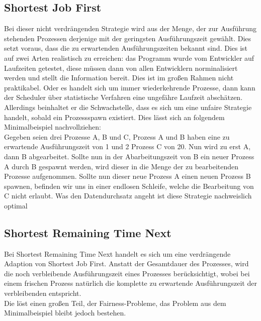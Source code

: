 \subsection{Shortest Job First}
Bei dieser nicht verdrängenden Strategie wird aus der Menge, der zur Ausführung stehenden Prozessen 
derjenige mit der geringsten Ausführungszeit gewählt. Dies setzt voraus, dass die zu erwartenden 
Ausführungszeiten bekannt sind. Dies ist auf zwei Arten realistisch zu erreichen: das Programm wurde vom 
Entwickler auf Laufzeiten getestet, diese müssen dann von allen Entwicklern norminalisiert werden und 
stellt die Information bereit. Dies ist im großen Rahmen nicht praktikabel. Oder es handelt sich um immer 
wiederkehrende Prozesse, dann kann der Scheduler über statistische Verfahren eine ungefähre Laufzeit 
abschätzen. \\
Allerdings beinhaltet er die Schwachstelle, dass es sich um eine unfaire Strategie handelt, sobald ein 
Prozessspawn existiert. Dies lässt sich an folgendem Minimalbeispiel nachvollziehen: \\
Gegeben seien drei Prozesse A, B und C, Prozess A und B haben eine zu erwartende Ausführungszeit von 1 und 
2 Prozess C von 20. Nun wird zu erst A, dann B abgearbeitet. Sollte nun in der Abarbeitungszeit von B ein 
neuer Prozess A durch B gespawnt werden, wird dieser in die Menge der zu bearbeitenden Prozesse 
aufgenommen. Sollte nun dieser neue Prozess A einen neuen Prozess B spawnen, befinden wir uns in einer 
endlosen Schleife, welche die Bearbeitung von C nicht erlaubt.
Was den Datendurchsatz angeht ist diese Strategie nachweislich optimal \cite{tanenb2009}


\subsection{Shortest Remaining Time Next}
Bei Shortest Remaining Time Next handelt es sich um eine verdrängende Adaption von Shortest Job First.  
Anstatt der Gesamtdauer des Prozesses, wird die noch verbleibende Ausführungszeit eines Prozesses 
berücksichtigt, wobei bei einem frischen Prozess natürlich die komplette zu erwartende Ausführungszeit der 
verbleibenden entspricht. \\
Die löst einen großen Teil, der Fairness-Probleme, das Problem aus dem Minimalbeispiel bleibt jedoch 
bestehen. 

